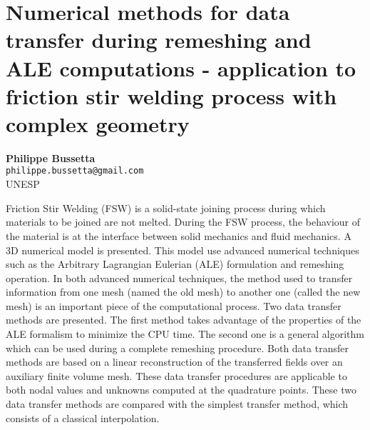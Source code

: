
\section{Numerical methods for data transfer during remeshing and ALE computations - application to friction stir welding process with complex geometry}

\textbf{Philippe Bussetta}\\
\texttt{\small{philippe.bussetta@gmail.com}}\\
UNESP

Friction Stir Welding (FSW) is a solid-state joining process during which materials to be joined are not melted. During the FSW process, the behaviour of the material is at the interface between solid mechanics and fluid mechanics. A 3D numerical model is presented. This model use advanced numerical techniques such as the Arbitrary Lagrangian Eulerian (ALE) formulation and remeshing operation. In both advanced numerical techniques, the method used to transfer information from one mesh (named the old mesh) to another one (called the new mesh) is an important piece of the computational process. Two data transfer methods are presented. The first method takes advantage of the properties of the ALE formalism to minimize the CPU time. The second one is a general algorithm which can be used during a complete remeshing procedure. Both data transfer methods are based on a linear reconstruction of the transferred fields over an auxiliary finite volume mesh. These data transfer procedures are applicable to both nodal values and unknowns computed at the quadrature points. These two data transfer methods are compared with the simplest transfer method, which consists of a classical interpolation.

